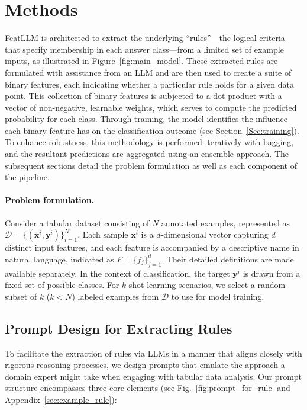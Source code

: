 \section{Methods}
\textsf{FeatLLM} is architected to extract the underlying “rules”—the logical criteria that specify membership in each answer class—from a limited set of example inputs, as illustrated in Figure~\ref{fig:main_model}. These extracted rules are formulated with assistance from an LLM and are then used to create a suite of binary features, each indicating whether a particular rule holds for a given data point. This collection of binary features is subjected to a dot product with a vector of non-negative, learnable weights, which serves to compute the predicted probability for each class. Through training, the model identifies the influence each binary feature has on the classification outcome (see Section~\ref{Sec:training}). To enhance robustness, this methodology is performed iteratively with bagging, and the resultant predictions are aggregated using an ensemble approach. The subsequent sections detail the problem formulation as well as each component of the pipeline.

\vspace*{-0.12in}
\paragraph{Problem formulation.} Consider a tabular dataset consisting of $N$ annotated examples, represented as $\mathcal{D} = \{(\mathbf{x}^i, \mathbf{y}^i)\}_{i=1}^{N}$. Each sample $\mathbf{x}^i$ is a $d$-dimensional vector capturing $d$ distinct input features, and each feature is accompanied by a descriptive name in natural language, indicated as $F = \{f_j\}_{j=1}^{d}$. Their detailed definitions are made available separately. In the context of classification, the target $\mathbf{y}^i$ is drawn from a fixed set of possible classes. For $k$-shot learning scenarios, we select a random subset of $k$ ($k<N$) labeled examples from $\mathcal{D}$ to use for model training.

\subsection{Prompt Design for Extracting Rules}
\label{Sec:prompt_design}
To facilitate the extraction of rules via LLMs in a manner that aligns closely with rigorous reasoning processes, we design prompts that emulate the approach a domain expert might take when engaging with tabular data analysis. Our prompt structure encompasses three core elements (see Fig.~\ref{fig:prompt_for_rule} and Appendix~\ref{sec:example_rule}):

